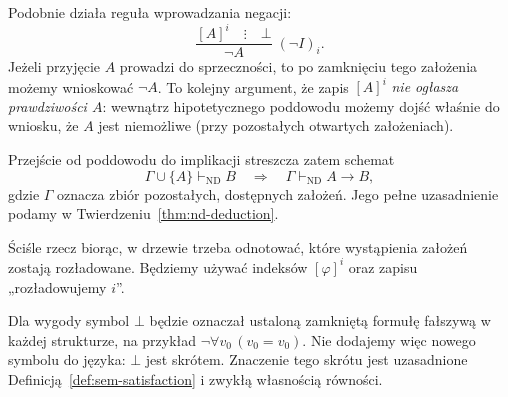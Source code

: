\begin{uwaga}
Podobnie działa reguła wprowadzania negacji:
\[
\frac{[A]^i\quad\vdots\quad\bot}{\neg A}\;(\neg I)_i.
\]
Jeżeli przyjęcie $A$ prowadzi do sprzeczności, to po
zamknięciu tego założenia możemy wnioskować $\neg A$.
To kolejny argument, że zapis $[A]^i$ \emph{nie ogłasza
prawdziwości $A$}: wewnątrz hipotetycznego poddowodu
możemy dojść właśnie do wniosku, że $A$ jest niemożliwe
(przy pozostałych otwartych założeniach).
\end{uwaga}

Przejście od poddowodu do implikacji streszcza zatem schemat
\[
\Gamma\cup\{A\}\vdash_{\mathrm{ND}}B
\quad\Longrightarrow\quad
\Gamma\vdash_{\mathrm{ND}}A\to B,
\]
gdzie $\Gamma$ oznacza zbiór pozostałych, dostępnych założeń.
Jego pełne uzasadnienie podamy w
Twierdzeniu~\ref{thm:nd-deduction}.

Ściśle rzecz biorąc, w drzewie trzeba odnotować, które
wystąpienia założeń zostają rozładowane. Będziemy używać indeksów
$[\varphi]^i$ oraz zapisu „rozładowujemy $i$”.

Dla wygody symbol $\bot$ będzie oznaczał ustaloną zamkniętą
formułę fałszywą w każdej strukturze, na przykład
$\neg\forall v_0\,(v_0=v_0)$.
Nie dodajemy więc nowego symbolu do języka: $\bot$ jest skrótem.
Znaczenie tego skrótu jest uzasadnione
Definicją~\ref{def:sem-satisfaction} i zwykłą własnością równości.

